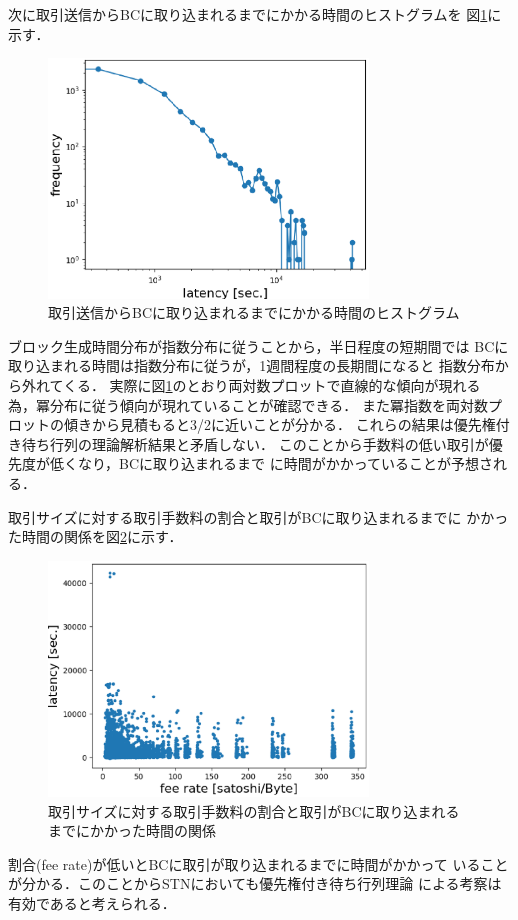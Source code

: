 \documentclass[graybox]{svmult}
\begin{document}
次に取引送信からBCに取り込まれるまでにかかる時間のヒストグラムを
図\ref{fig:exp3-2}に示す．
%
\begin{figure}[tb]
  \vspace{-20mm}
  \begin{center}
    \includegraphics[width=85mm]{exp3-2.eps}
  \end{center}
  \vspace{20mm}
  \caption{取引送信からBCに取り込まれるまでにかかる時間のヒストグラム}
  \label{fig:exp3-2}
\end{figure}
%
ブロック生成時間分布が指数分布に従うことから，半日程度の短期間では
BCに取り込まれる時間は指数分布に従うが，1週間程度の長期間になると
指数分布から外れてくる．
実際に図\ref{fig:exp3-2}のとおり両対数プロットで直線的な傾向が現れる
為，冪分布に従う傾向が現れていることが確認できる．
また冪指数を両対数プロットの傾きから見積もると3/2に近いことが分かる．
これらの結果は優先権付き待ち行列の理論解析結果と矛盾しない．
このことから手数料の低い取引が優先度が低くなり，BCに取り込まれるまで
に時間がかかっていることが予想される．

取引サイズに対する取引手数料の割合と取引がBCに取り込まれるまでに
かかった時間の関係を図\ref{fig:exp3-3}に示す．
%
\begin{figure}[tb]
  \vspace{-20mm}
  \begin{center}
    \includegraphics[width=85mm]{exp3-3.eps}
  \end{center}
  \vspace{20mm}
  \caption{取引サイズに対する取引手数料の割合と取引がBCに取り込まれるまでにかかった時間の関係}
  \label{fig:exp3-3}
\end{figure}
%
割合(fee rate)が低いとBCに取引が取り込まれるまでに時間がかかって
いることが分かる．このことからSTNにおいても優先権付き待ち行列理論
による考察は有効であると考えられる．
\end{document}
